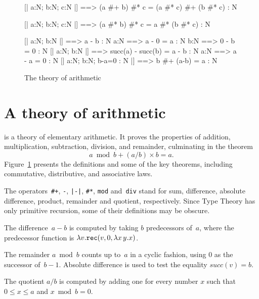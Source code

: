 \begin{figure}
\begin{ttbox}
     [| a:N;  b:N;  c:N |] ==> 
                  (a #+ b) #* c = (a #* c) #+ (b #* c) : N

        [| a:N;  b:N;  c:N |] ==> 
                  (a #* b) #* c = a #* (b #* c) : N

       [| a:N;  b:N |] ==> a - b : N
            a:N ==> a - 0 = a : N
       b:N ==> 0 - b = 0 : N
    [| a:N;  b:N |] ==> succ(a) - succ(b) = a - b : N
    a:N ==> a - a = 0 : N
  [| a:N;  b:N;  b-a=0 : N |] ==> b #+ (a-b) = a : N
\end{ttbox}
\caption{The theory of arithmetic} \label{ctt_arith}
\end{figure}


\section{A theory of arithmetic}
 is a theory of elementary arithmetic.  It proves the
properties of addition, multiplication, subtraction, division, and
remainder, culminating in the theorem
\[ a \bmod b + (a/b)\times b = a. \]
Figure~\ref{ctt_arith} presents the definitions and some of the key
theorems, including commutative, distributive, and associative laws.

The operators~\verb'#+', \verb'-', \verb'|-|', \verb'#*', \verb'mod'
and~\verb'div' stand for sum, difference, absolute difference, product,
remainder and quotient, respectively.  Since Type Theory has only primitive
recursion, some of their definitions may be obscure.  

The difference~$a-b$ is computed by taking $b$ predecessors of~$a$, where
the predecessor function is $\lambda v. {\tt rec}(v, 0, \lambda x\,y. x)$.

The remainder $a\bmod b$ counts up to~$a$ in a cyclic fashion, using 0
as the successor of~$b-1$.  Absolute difference is used to test the
equality $succ(v)=b$.

The quotient $a/b$ is computed by adding one for every number $x$
such that $0\leq x \leq a$ and $x\bmod b = 0$.



